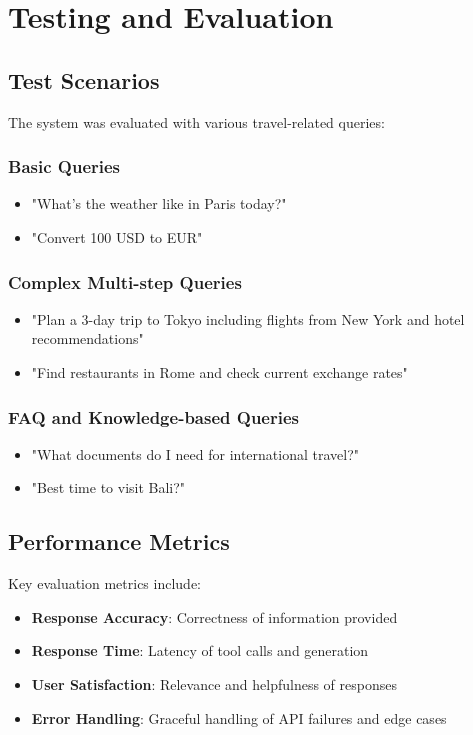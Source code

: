 \documentclass[12pt,a4paper]{article}
\begin{document}
\section{Testing and Evaluation}

\subsection{Test Scenarios}
The system was evaluated with various travel-related queries:

\subsubsection{Basic Queries}
\begin{itemize}
\item "What's the weather like in Paris today?"
\item "Convert 100 USD to EUR"
\end{itemize}

\subsubsection{Complex Multi-step Queries}
\begin{itemize}
\item "Plan a 3-day trip to Tokyo including flights from New York and hotel recommendations"
\item "Find restaurants in Rome and check current exchange rates"
\end{itemize}

\subsubsection{FAQ and Knowledge-based Queries}
\begin{itemize}
\item "What documents do I need for international travel?"
\item "Best time to visit Bali?"
\end{itemize}

\subsection{Performance Metrics}
Key evaluation metrics include:
\begin{itemize}
\item \textbf{Response Accuracy}: Correctness of information provided
\item \textbf{Response Time}: Latency of tool calls and generation
\item \textbf{User Satisfaction}: Relevance and helpfulness of responses
\item \textbf{Error Handling}: Graceful handling of API failures and edge cases
\end{itemize}
\end{document}
